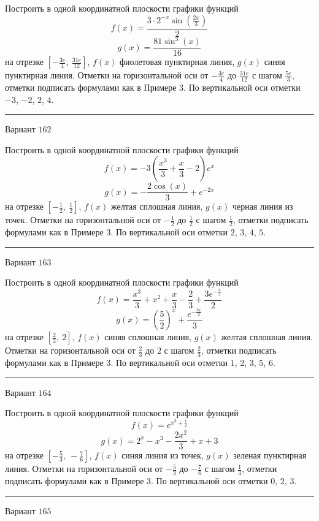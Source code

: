 \documentclass[11pt]{report}
\begin{document}
Построить в одной координатной плоскости графики функций $$f(x) = \frac{3 \cdot 2^{- x} \sin{\left(\frac{2 x}{3} \right)}}{2}$$ $$g(x) = \frac{81 \sin^{3}{\left(x \right)}}{16}$$ на отрезке $\left[- \frac{3 e}{4}, \  \frac{31 e}{12}\right]$, $f(x)$ фиолетовая пунктирная линия, $g(x)$ синяя пунктирная линия. Отметки на горизонтальной оси от $- \frac{3 e}{4}$ до $\frac{31 e}{12}$ с шагом $\frac{5 e}{3}$, отметки подписать формулами как в Примере 3. По вертикальной оси отметки $-3$, $-2$, $2$, $4$.
\begin{center}
\noindent\rule{8cm}{0.4pt}
\end{center}
Вариант $162$


Построить в одной координатной плоскости графики функций $$f(x) = - 3 \left(\frac{x^{3}}{3} + \frac{x}{3} - 2\right) e^{x}$$ $$g(x) = - \frac{2 \cos{\left(x \right)}}{3} + e^{- 2 x}$$ на отрезке $\left[- \frac{1}{2}, \  \frac{1}{2}\right]$, $f(x)$ желтая сплошная линия, $g(x)$ черная линия из точек. Отметки на горизонтальной оси от $- \frac{1}{2}$ до $\frac{1}{2}$ с шагом $\frac{1}{2}$, отметки подписать формулами как в Примере 3. По вертикальной оси отметки $2$, $3$, $4$, $5$.
\begin{center}
\noindent\rule{8cm}{0.4pt}
\end{center}
Вариант $163$


Построить в одной координатной плоскости графики функций $$f(x) = \frac{x^{3}}{3} + x^{2} + \frac{x}{3} - \frac{2}{3} + \frac{3 e^{- \frac{x}{2}}}{2}$$ $$g(x) = \left(\frac{5}{2}\right)^{x} + \frac{e^{- \frac{3 x}{2}}}{3}$$ на отрезке $\left[\frac{2}{3}, \  2\right]$, $f(x)$ синяя сплошная линия, $g(x)$ желтая сплошная линия. Отметки на горизонтальной оси от $\frac{2}{3}$ до $2$ с шагом $\frac{2}{3}$, отметки подписать формулами как в Примере 3. По вертикальной оси отметки $1$, $2$, $3$, $5$, $6$.
\begin{center}
\noindent\rule{8cm}{0.4pt}
\end{center}
Вариант $164$


Построить в одной координатной плоскости графики функций $$f(x) = e^{x^{3} + \frac{1}{2}}$$ $$g(x) = 2^{x} - x^{3} - \frac{2 x^{2}}{3} + x + 3$$ на отрезке $\left[- \frac{5}{3}, \  - \frac{7}{6}\right]$, $f(x)$ синяя линия из точек, $g(x)$ зеленая пунктирная линия. Отметки на горизонтальной оси от $- \frac{5}{3}$ до $- \frac{7}{6}$ с шагом $\frac{1}{4}$, отметки подписать формулами как в Примере 3. По вертикальной оси отметки $0$, $2$, $3$.
\begin{center}
\noindent\rule{8cm}{0.4pt}
\end{center}
Вариант $165$
\end{document}

